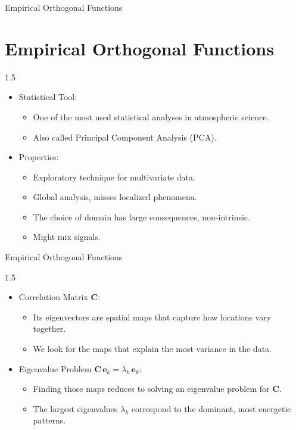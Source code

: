 

\begin{frame}{Empirical Orthogonal Functions}
    \section{Empirical Orthogonal Functions}
\begin{spacing}{1.5} 
\begin{itemize}
\item Statistical Tool:
\begin{itemize}
    \item One of the most used statistical analyses in atmospheric science.
    \item Also called Principal Component Analysis (PCA).
\end{itemize}
\item Properties:
\begin{itemize}
    \item Exploratory technique for multivariate data.
    \item Global analysis, misses localized phenomena.
    \item The choice of domain has large consequences, non-intrinsic.
    \item Might mix signals.
\end{itemize}
\end{itemize}
\end{spacing}
\end{frame}


\begin{frame}{Empirical Orthogonal Functions}
\begin{spacing}{1.5} 
\begin{itemize}
\item Correlation Matrix $\mathbf{C}$:
\begin{itemize}
    \item Its eigenvectors are spatial maps that capture how locations vary together.
    \item We look for the maps that explain the most variance in the data.
\end{itemize}
\item Eigenvalue Problem $\mathbf{C}\,\mathbf{e}_k = \lambda_k\,\mathbf{e}_k$:
\begin{itemize}
    \item Finding those maps reduces to solving an eigenvalue problem for $\mathbf{C}$.
    \item The largest eigenvalues $\lambda_k$ correspond to the dominant, most energetic patterns.
\end{itemize}
\end{itemize}
\end{spacing}
\end{frame}



